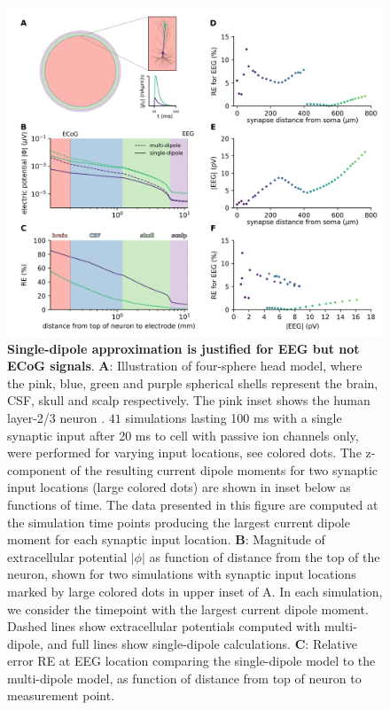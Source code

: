 \documentclass[preprint,10pt,authoryear]{elsarticle}
\newcommand{\hlg}[2][Emerald]{ {\sethlcolor{#1} \hl{#2}} }
\newcommand{\sntxt}[1]{{\color{NavyBlue}#1}}
\newcommand{\tvnnote}[1]{\color{white}{\hlg{TVN: #1 }}\color{black}}
\begin{document}
\begin{figure}[H]
	\centering
	\includegraphics[width=1.0\textwidth]{figure2_eeg.png}
	\caption{\textbf{Single-dipole approximation is justified for EEG but not ECoG signals}. 
		\textbf{A}: Illustration of four-sphere head model, where the pink, blue, green and purple spherical shells represent the brain, CSF, skull and scalp respectively. The pink inset shows the human layer-2/3 neuron \citep{EYAL2016}. $41$ simulations lasting 100 ms with a single synaptic input after 20 ms to cell with passive ion channels only, were performed for varying input locations, see colored dots. \sntxt{The z-component of the resulting current dipole moments for two synaptic input locations (large colored dots) are shown in inset below as functions of time. The data presented in this figure are computed at the simulation time points producing the largest current dipole moment for each synaptic input location.}
		\textbf{B}: Magnitude of extracellular potential $|\phi|$ as function of distance from the top of the neuron, shown for two simulations with synaptic input locations marked by large colored dots in upper inset of A. In each simulation, we consider the timepoint with the largest current dipole moment. Dashed lines show extracellular potentials computed with multi-dipole, and full lines show single-dipole calculations.
		\textbf{C}: Relative error RE at EEG location comparing the single-dipole model to the multi-dipole model, as function of distance from top of neuron to measurement point.
}
\end{figure}
\end{document}
